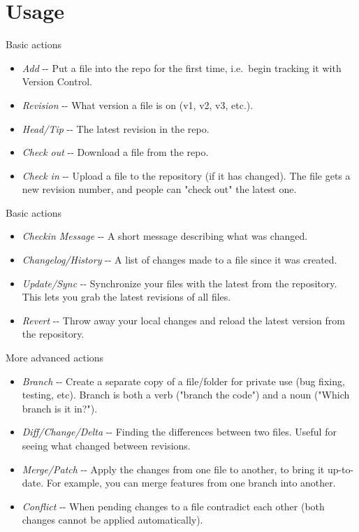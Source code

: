 \documentclass[aspectratio=169]{beamer}
\begin{document}
\section{Usage}

\begin{frame}{Basic actions}

\begin{itemize}
\item
  \emph{Add} -\/- Put a file into the repo for the first time,
  i.e.~begin tracking it with Version Control.
\item
  \emph{Revision} -\/- What version a file is on (v1, v2, v3, etc.).
\item
  \emph{Head/Tip} -\/- The latest revision in the repo.
\item
  \emph{Check out} -\/- Download a file from the repo.
\item
  \emph{Check in} -\/- Upload a file to the repository (if it has
  changed). The file gets a new revision number, and people can "check
  out" the latest one.
  \end{itemize}
  
  \end{frame}

\begin{frame}{Basic actions}

\begin{itemize}
\item
  \emph{Checkin Message} -\/- A short message describing what was
  changed.
\item
  \emph{Changelog/History} -\/- A list of changes made to a file since
  it was created.
\item
  \emph{Update/Sync} -\/- Synchronize your files with the latest from
  the repository. This lets you grab the latest revisions of all files.
\item
  \emph{Revert} -\/- Throw away your local changes and reload the latest
  version from the repository.
\end{itemize}

\end{frame}

\begin{frame}{More advanced actions}

\begin{itemize}
\item
  \emph{Branch} -\/- Create a separate copy of a file/folder for private
  use (bug fixing, testing, etc). Branch is both a verb ("branch the
  code") and a noun ("Which branch is it in?").
\item
  \emph{Diff/Change/Delta} -\/- Finding the differences between two
  files. Useful for seeing what changed between revisions.
\item
  \emph{Merge/Patch} -\/- Apply the changes from one file to another, to
  bring it up-to-date. For example, you can merge features from one
  branch into another.
\item
  \emph{Conflict} -\/- When pending changes to a file contradict each
  other (both changes cannot be applied automatically).
\end{itemize}
\end{frame}
\end{document}

